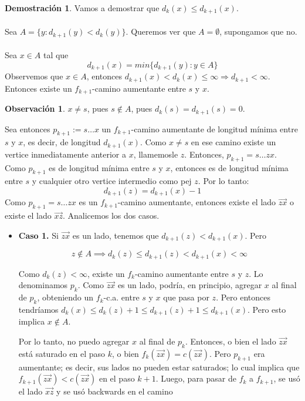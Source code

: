 \documentclass[11pt, a4paper]{article}
\theoremstyle{definition}
\newtheorem*{demostracion}{Demostración}
\newtheorem*{remark}{Observación}
\begin{document}
\begin{demostracion}
    Vamos a demostrar que $d_k(x) \leq d_{k+1}(x)$.\\ \\
    Sea $A=\{y: d_{k+1}(y)<d_k(y)\}$. Queremos ver que $A=\emptyset$, supongamos que no.\\ \\
    Sea $x \in A$ tal que
    \begin{equation}
        d_{k+1}(x)=min\{d_{k+1}(y): y \in A\}
    \end{equation}
    Observemos que $x \in A$, entonces $d_{k+1}(x)<d_k(x) \leq \infty  \Rightarrow d_{k+1} < \infty$. Entonces existe un $f_{k+1}$-camino aumentante
    entre $s$ y $x$. 
    \begin{remark}
        $x \neq s$, pues $s\notin A$, pues $d_k(s)=d_{k+1}(s)=0$.
    \end{remark}
    Sea entonces $p_{k+1}:=s \ldots x$ un $f_{k+1}$-camino aumentante de longitud mínima entre $s$ y $x$, es decir, de longitud $d_{k+1}(x)$. Como 
    $x\neq s$ en ese camino existe un vertice inmediatamente anterior a $x$, llamemosle $z$. Entonces, $p_{k+1}=s \ldots zx$.\\
    Como $p_{k+1}$ es de longitud mínima entre $s$ y $x$, entonces es de longitud mínima entre $s$ y cualquier otro vertice intermedio como pej $z$. Por 
    lo tanto:
    \begin{equation}
        d_{k+1}(z)=d_{k+1}(x)-1
    \end{equation}
    Como $p_{k+1} = s \ldots zx$ es un $f_{k+1}$-camino aumentante, entonces existe el lado $\overrightarrow{zx}$ o existe el lado 
    $\overrightarrow{xz}$. Analicemos los dos casos.
    \begin{itemize}
        \item \textbf{Caso 1.} Si $\overrightarrow{zx}$ es un lado, tenemos que $d_{k+1}(z) < d_{k+1}(x)$. Pero
         
        \[ z \notin A \implies d_k(z) \leq d_{k+1}(z) < d_{k+1}(x) < \infty \]
        
        Como $d_k(z) < \infty$, existe un $f_k$-camino aumentante entre $s$ y $z$. 
        Lo denominamos $p_k$. Como $\overrightarrow{zx}$ es un lado, podría, en principio, agregar $x$ al final de $p_k$, 
        obteniendo un $f_k$-c.a. entre $s$ y $x$ que pasa por $z$. Pero entonces tendríamos 
        $d_k(x) \leq d_k(z) + 1 \leq d_{k+1}(z) + 1 \leq d_{k+1}(x)$. 
        Pero esto implica $x \notin A$. 
        
        Por lo tanto, no puedo agregar $x$ al final de $p_k$. 
        Entonces, o bien el lado $\overrightarrow{zx}$ está saturado en el paso $k$, o bien $f_k(\overrightarrow{zx}) = c(\overrightarrow{zx})$. 
        Pero $p_{k+1}$ era aumentante; es decir, sus lados no pueden estar saturados; 
        lo cual implica que $f_{k+1}(\overrightarrow{zx}) < c(\overrightarrow{zx})$ en el paso $k + 1$. 
        Luego, para pasar de $f_k$ a $f_{k+1}$, se usó el lado $\overrightarrow{xz}$ y se usó backwards en el camino
        

\end{itemize}
\end{demostracion}
\end{document}
